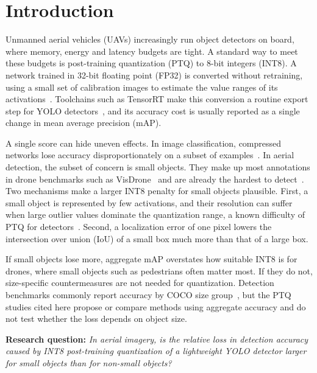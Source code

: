 \documentclass[conference]{IEEEtran}
\begin{document}
\section{Introduction}
\label{sec:introduction}

Unmanned aerial vehicles (UAVs) increasingly run object detectors on board, where memory, energy
and latency budgets are tight. A standard way to meet these budgets is post-training quantization
(PTQ) to 8-bit integers (INT8). A network trained in 32-bit floating point (FP32) is converted
without retraining, using a small set of calibration images to estimate the value ranges of its
activations~\cite{jacob2018quantization,nagel2021whitepaper}. Toolchains
such as TensorRT make this conversion a routine export step for YOLO
detectors~\cite{ultralytics_tensorrt}, and its accuracy cost is usually reported as a single
change in mean average precision (mAP).

A single score can hide uneven effects. In image classification, compressed networks lose
accuracy disproportionately on a subset of examples~\cite{hooker2019forget}. In aerial
detection, the subset of concern is small objects. They make up most annotations in drone
benchmarks such as
VisDrone~\cite{zhu2022visdrone,cao2021visdrone} and are already the hardest to
detect~\cite{akyon2022sahi}. Two mechanisms make a larger INT8 penalty for small objects
plausible. First, a small object is represented by few activations, and their resolution can
suffer when large outlier values dominate the quantization range, a known difficulty of PTQ for
detectors~\cite{nagel2021whitepaper,kim2026inlier}. Second, a localization error of one pixel
lowers the intersection over union (IoU) of a small box much more than that of a large box.

If small objects lose more, aggregate mAP overstates how suitable INT8 is for drones, where small
objects such as pedestrians often matter most. If they do not, size-specific countermeasures are
not needed for quantization. Detection benchmarks commonly report accuracy by COCO size
group~\cite{lin2014coco}, but the PTQ studies cited here propose or compare methods using
aggregate accuracy and do not test whether the loss depends on object size.

\textbf{Research question:} \emph{In aerial imagery, is the relative loss in detection
accuracy caused by INT8 post-training quantization of a lightweight YOLO detector larger for
small objects than for non-small objects?}
\end{document}

